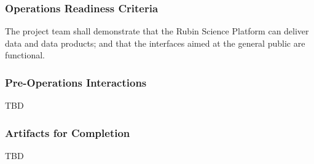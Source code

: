 \subsubsection{Operations Readiness Criteria}
The project team shall demonstrate that the Rubin Science Platform can deliver data and data products; and that the interfaces aimed at the general public are functional.

\subsubsection{Pre-Operations Interactions}
TBD

\subsubsection{Artifacts for Completion}
TBD
